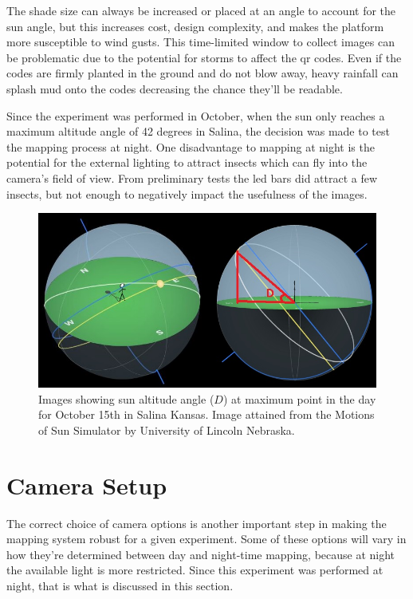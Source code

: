 The shade size can always be increased or placed at an angle to account for the sun angle, but this increases cost, design complexity, and makes the platform more susceptible to wind gusts.  This time-limited window to collect images can be problematic due to the potential for storms to affect the \ac{qr} codes.  Even if the codes are firmly planted in the ground and do not blow away, heavy rainfall can splash mud onto the codes decreasing the chance they'll be readable. 

Since the experiment was performed in October, when the sun only reaches a maximum altitude angle of 42 degrees in Salina, the decision was made to test the mapping process at night.  One disadvantage to mapping at night is the potential for the external lighting to attract insects which can fly into the camera's field of view.  From preliminary tests the \ac{led} bars did attract a few insects, but not enough to negatively impact the usefulness of the images.

\begin{figure}
	\centering
    \includegraphics[width=5in]{figures/sun_angle2.jpg}
    \caption[Sun angle]{Images showing sun altitude angle ($D$) at maximum point in the day for October 15th in Salina Kansas.  Image attained from the Motions of Sun Simulator by University of Lincoln Nebraska.}
    \label{figure:sun_angle}
\end{figure}  

\section{Camera Setup}

The correct choice of camera options is another important step in making the mapping system robust for a given experiment.  Some of these options will vary in how they're determined between day and night-time mapping, because at night the available light is more restricted.  Since this experiment was performed at night, that is what is discussed in this section.


